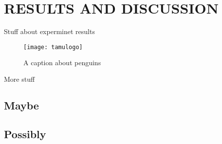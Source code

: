%
%  
%



\chapter{RESULTS AND DISCUSSION}

Stuff about experminet results

\begin{figure}[ht]
    \centering
    \texttt{[image: tamulogo]}
    \caption{A caption about penguins}
\end{figure}

More stuff

\section{Maybe}

\section{Possibly}
